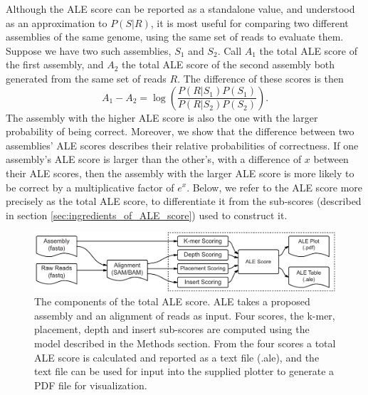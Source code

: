 \documentclass[phd,tocprelim]{cornell}
\begin{document}
Although the ALE score can be reported as a standalone value, and understood as an approximation to $P(S|R)$, it is most useful for comparing two different assemblies of the same genome, using the same set of reads to evaluate them. Suppose we have two such assemblies, $S_{1}$ and $S_{2}$.  Call $A_{1}$ the total ALE score of the first assembly, and $A_{2}$ the total ALE score of the second assembly both generated from the same set of reads $R$. The difference of these scores is then
\begin{equation}
    A_{1} - A_{2} = \log\left(\frac{P\left(R|S_{1}\right)P\left(S_{1}\right)}{P\left(R|S_{2}\right)P\left(S_{2}\right)}\right).
\end{equation}
The assembly with the higher ALE score is also the one with the larger probability of being correct.  Moreover, we show that the difference between two assemblies' ALE scores describes their relative probabilities of correctness.  If one assembly's ALE score is larger than the other's, with a difference of $x$ between their ALE scores, then the assembly with the larger ALE score is more likely to be correct by a multiplicative factor of $e^{x}$.  Below, we refer to the ALE score more precisely as the total ALE score, to differentiate it from the sub-scores (described in section \ref{sec:ingredients_of_ALE_score}) used to construct it.

\begin{figure}[!htpb]%
    \centerline{\includegraphics[width=\textwidth]{figures/ALE/Clark_Fig1c.pdf}}
    \caption[Components of the ALE score]{The components of the total ALE score. ALE takes a proposed assembly and an alignment of reads as input. Four scores, the k-mer, placement, depth and insert sub-scores are computed using the model described in the Methods section. From the four scores a total ALE score is calculated and reported as a text file (.ale), and the text file can be used for input into the supplied plotter to generate a PDF file for visualization.}\label{fig:01}
\end{figure}
\end{document}
